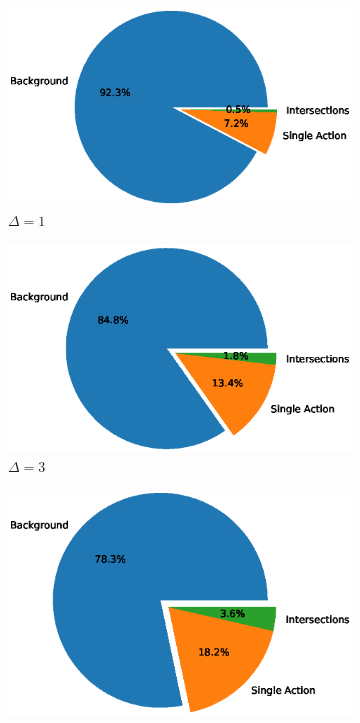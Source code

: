 \begin{figure}
    \centering
    \begin{subfigure}{.24\textwidth}
        \centering
        \includegraphics[width=.95\linewidth]{img/05_background_ratio_all_delta_1.eps}
        \caption{$\Delta = 1$}
    \end{subfigure}%
    \begin{subfigure}{.24\textwidth}
        \centering
        \includegraphics[width=.95\linewidth]{img/05_background_ratio_all_delta_3.eps}
        \caption{$\Delta = 3$}
    \end{subfigure}%
    \begin{subfigure}{.24\textwidth}
        \centering
        \includegraphics[width=.95\linewidth]{img/05_background_ratio_all_delta_5.eps}

\end{subfigure}
\end{figure}
